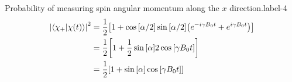 \documentclass[../main.tex]{subfiles}
\begin{document}
\begin{sol}{Probability of measuring spin angular momentum along the $x$ direction.}{label-4}
    \begin{align*}
        \abs{\braket{\chi_+}{\chi\qty(t)}}^2 &=\frac{1}{2}\qty[1+\cos\qty[\alpha/2]\sin\qty[\alpha/2]\qty(e^{-i\gamma B_0t}+e^{i\gamma B_0t})] \\
                                             &=\frac{1}{2}\qty[1+\frac{1}{2}\sin\qty[\alpha]2\cos\qty[\gamma B_0t]] \\
                                             &=\frac{1}{2}\qty[1+\sin\qty[\alpha]\cos\qty[\gamma B_0t]]
    \end{align*}


\end{sol}
\end{document}
